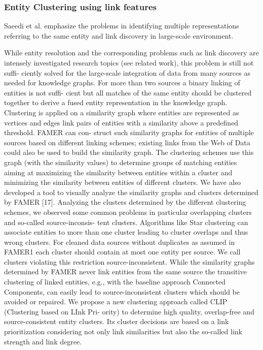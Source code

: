 \documentclass[runningheads]{llncs}
\begin{document}
\subsubsection{Entity Clustering using link features} \label{entity-clustering} 
Saeedi et al. \cite{Saeedi} emphasize the problems in identifying multiple representations referring to the same entity and link discovery in large-scale environment.


While entity resolution and the corresponding problems such as link discovery are intensely investigated research topics (see related work), this problem is still not suffi- ciently solved for the large-scale integration of data from many sources as needed for knowledge graphs. For more than two sources a binary linking of entities is not suffi- cient but all matches of the same entity should be clustered together to derive a fused entity representation in the knowledge graph. 
Clustering
is applied on a similarity graph where entities are represented as vertices and edges link pairs of entities with a similarity above a predefined threshold. FAMER can con- struct such similarity graphs for entities of multiple sources based on different linking schemes; existing links from the Web of Data could also be used to build the similarity graph. The clustering schemes use this graph (with the similarity values) to determine groups of matching entities aiming at maximizing the similarity between entities within a cluster and minimizing the similarity between entities of different clusters. We have also developed a tool to visually analyze the similarity graphs and clusters determined by FAMER [17].
Analyzing the clusters determined by the different clustering schemes, we observed some common problems in particular overlapping clusters and so-called source-inconsis- tent clusters. Algorithms like Star clustering can associate entities to more than one cluster leading to cluster overlaps and thus wrong clusters. For cleaned data sources without duplicates as assumed in FAMER1 each cluster should contain at most one entity per source. We call clusters violating this restriction source-inconsistent. While the similarity graphs determined by FAMER never link entities from the same source the transitive clustering of linked entities, e.g., with the baseline approach Connected Components, can easily lead to source-inconsistent clusters which should be avoided or repaired.
We propose a new clustering approach called CLIP (Clustering based on LInk Pri- ority) to determine high quality, overlap-free and source-consistent entity clusters. Its cluster decisions are based on a link prioritization considering not only link similarities but also the so-called link strength and link degree.
\end{document}
